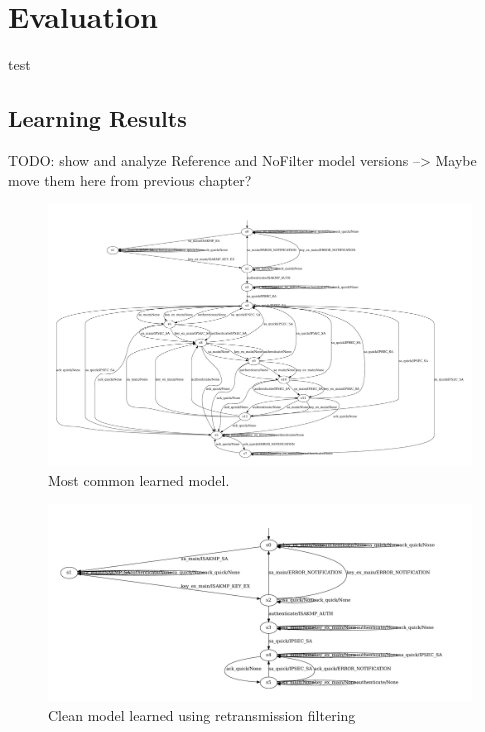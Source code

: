 %
%
% 
% 
% 

\chapter{Evaluation}

\label{chap:Evaluation}
test
\section{Learning Results} \label{subsec:learnresults}
TODO: show and analyze Reference and NoFilter model versions --> Maybe move them here from previous chapter?

\begin{figure}[h]
	\centering
	\includegraphics[width=0.7\linewidth]{images/NoFilterA}
	\caption{Most common learned model.}
	\label{fig:nofiltera}
\end{figure}

\begin{figure}[h]
	\centering
	\includegraphics[width=0.9\linewidth]{images/Reference}
	\caption{Clean model learned using retransmission filtering}
	\label{fig:reference}
\end{figure}


